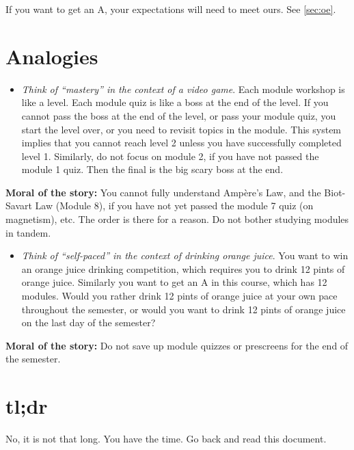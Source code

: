 \documentclass[12pt]{article}
\begin{document}
\noindent If you want to get an A, your expectations will need to meet ours. See \ref{sec:oe}.

\section{Analogies} \label{sec:a}

\begin{itemize}
	\item \emph{Think of ``mastery'' in the context of a video game}. Each module workshop is like a level. Each module quiz is like a boss at the end of the level. If you cannot pass the boss at the end of the level, or pass your module quiz, you start the level over, or you need to revisit topics in the module. This system implies that you cannot reach level 2 unless you have successfully completed level 1. Similarly, do not focus on module 2, if you have not passed the module 1 quiz. Then the final is the big scary boss at the end. 
\end{itemize}
	
\noindent \textbf{Moral of the story:} You cannot fully understand Amp\`{e}re's Law, and the Biot-Savart Law (Module 8), if you have not yet passed the module 7 quiz  (on magnetism), etc. The order is there for a reason. Do not bother studying modules in tandem.

\begin{itemize}
	\item \emph{Think of ``self-paced'' in the context of drinking orange juice}. You want to win an orange juice drinking competition, which requires you to drink 12 pints of orange juice. Similarly you want to get an A in this course, which has 12 modules. Would you rather drink 12 pints of orange juice at your own pace throughout the semester, or would you want to drink 12 pints of orange juice on the last day of the semester?
\end{itemize}
	
\noindent \textbf{Moral of the story:} Do not save up module quizzes or prescreens for the end of the semester. 

\section{tl;dr} \label{sec:tldr}

\noindent No, it is not that long. You have the time. Go back and read this document.
\end{document}
